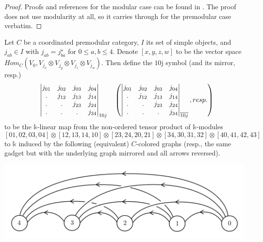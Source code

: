 \begin{proof}
  Proofs and references for the modular case can be found in
  \cite[section VI.5.4]{turaev-qiok-3-manifolds}. The proof does
  not use modularity at all, so it carries through for the
  premodular case verbatim.
\end{proof}

\begin{definition}[$10$j-symbol]\label{def/10j-symbol}
  Let $C$ be a coordinated premodular category, $I$ its set of
  simple objects, and $j_{ab} \in I$ with $j_{ab} = j_{ba}^{\star}$ for
  $0 \leq a, b \leq 4$.
  Denote $[x,y,z,w]$ to be the vector space
  $Hom_{C}(V_{0}, V_{j_{x}} \otimes V_{j_{y}} \otimes V_{j_{z}} \otimes V_{j_{w}})$.
  Then define the $10$j symbol (and its mirror, resp.)
  $$
  \begin{vmatrix} j_{01} & j_{02} & j_{03} & j_{04} \\ . & j_{12} & j_{13} & j_{14} \\ . & . & j_{23} & j_{24} \\ . & . & . & j_{34} \\ \end{vmatrix}_{10j} \quad \left(\begin{vmatrix} j_{01} & j_{02} & j_{03} & j_{04} \\ . & j_{12} & j_{13} & j_{14} \\ . & . & j_{23} & j_{24} \\ . & . & . & j_{34} \\ \end{vmatrix}_{\overline{10j}}, resp.\right)
  $$
  to be the $\mathbb{k}$-linear map from the non-ordered tensor
  product of $\mathbb{k}$-modules
  $$
  [01,02,03,04] \otimes
  [12,13,14,10] \otimes
  [23,24,20,21] \otimes
  [34,30,31,32] \otimes
  [40,41,42,43]
  $$
  to $\mathbb{k}$ induced by the following (equivalent)
  $C$-colored graphs (resp., the same gadget but with the
  underlying graph mirrored and all arrows reversed).
  \begin{center}\label{graph/10j-symbol}
    \includegraphics[height=4cm]{10j-plain}

\end{center}
\end{definition}
